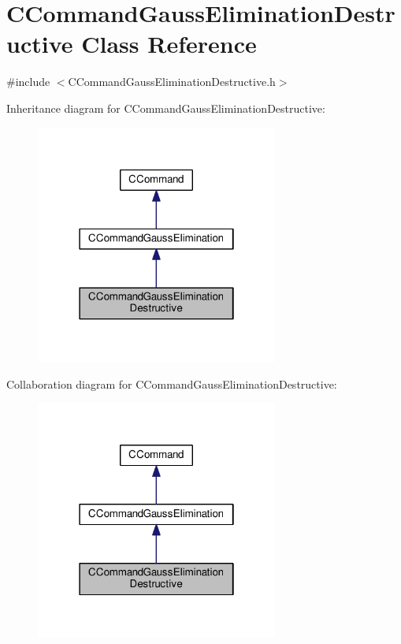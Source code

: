 \hypertarget{classCCommandGaussEliminationDestructive}{}\section{C\+Command\+Gauss\+Elimination\+Destructive Class Reference}
\label{classCCommandGaussEliminationDestructive}


{\ttfamily \#include $<$C\+Command\+Gauss\+Elimination\+Destructive.\+h$>$}



Inheritance diagram for C\+Command\+Gauss\+Elimination\+Destructive\+:\nopagebreak
\begin{figure}[H]
\begin{center}
\leavevmode
\includegraphics[width=226pt]{classCCommandGaussEliminationDestructive__inherit__graph}
\end{center}
\end{figure}


Collaboration diagram for C\+Command\+Gauss\+Elimination\+Destructive\+:\nopagebreak
\begin{figure}[H]
\begin{center}
\leavevmode
\includegraphics[width=226pt]{classCCommandGaussEliminationDestructive__coll__graph}
\end{center}
\end{figure}
